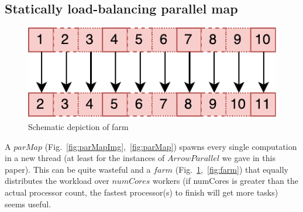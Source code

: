 \documentclass{jfp1}
\newcommand{\Conid}[1]{\mathit{#1}}
\newcommand{\Varid}[1]{\mathit{#1}}
\begin{document}
\subsection{Statically load-balancing parallel map}
\begin{figure}[h]
	\includegraphics[scale=0.7]{images/farm}
	\caption{Schematic depiction of farm}
	\label{fig:farmImg}
\end{figure}
A \ensuremath{\Varid{parMap}} (Fig.~\ref{fig:parMapImg},~\ref{fig:parMap}) spawns every single computation in a new thread (at least for the instances of \ensuremath{\Conid{ArrowParallel}} we gave in this paper). This can be quite wasteful and a \ensuremath{\Varid{farm}} (Fig.~\ref{fig:farmImg},~\ref{fig:farm}) that equally distributes the workload over \ensuremath{\Varid{numCores}} workers (if numCores is greater than the actual processor count, the fastest processor(s) to finish will get more tasks) seems useful.
\end{document}
